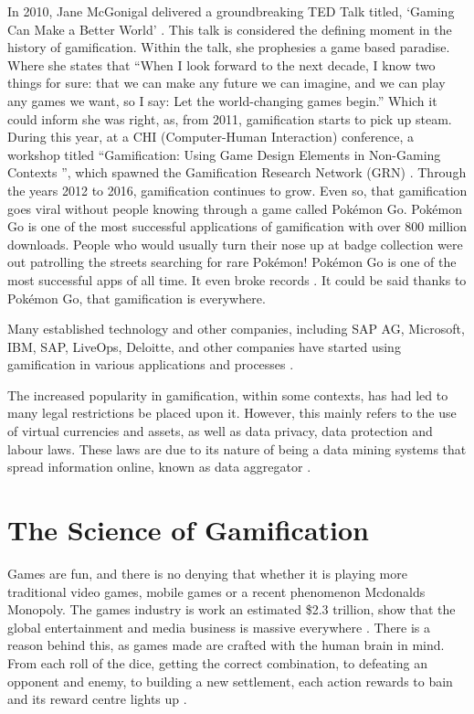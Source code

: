 		In 2010, Jane McGonigal delivered a groundbreaking TED Talk titled, ‘Gaming Can Make a Better World’ \cite{janeted}. This talk is considered the defining moment in the history of gamification. Within the talk, she prophesies a game based paradise. Where she states that “When I look forward to the next decade, I know two things for sure: that we can make any future we can imagine, and we can play any games we want, so I say: Let the world-changing games begin.\cite{janeted}” Which it could inform she was right, as, from 2011, gamification starts to pick up steam. During this year, at a CHI (Computer-Human Interaction) conference, a workshop titled “Gamification: Using Game Design Elements in Non-Gaming Contexts \cite{chi2011}”, which spawned the Gamification Research Network (GRN) \cite{gamresearch}. Through the years 2012 to 2016, gamification continues to grow. Even so, that gamification goes viral without people knowing through a game called Pokémon Go. Pokémon Go is one of the most successful applications of gamification with over 800 million downloads. People who would usually turn their nose up at badge collection were out patrolling the streets searching for rare Pokémon! Pokémon Go is one of the most successful apps of all time. It even broke records \cite{pokegwr,history}. It could be said thanks to Pokémon Go, that gamification is everywhere.
		
		Many established technology and other companies, including SAP AG, Microsoft, IBM, SAP, LiveOps, Deloitte, and other companies have started using gamification in various applications and processes \cite{silv11}.
		
		The increased popularity in gamification, within some contexts, has had led to many legal restrictions be placed upon it. However, this mainly refers to the use of virtual currencies and assets, as well as data privacy, data protection and labour laws. These laws are due to its nature of being a data mining systems that spread information online, known as data aggregator \cite{gamelaw,dataagg}.

	\section{The Science of Gamification}
		\label{sec:google_fu}
		
		Games are fun, and there is no denying that whether it is playing more traditional video games, mobile games or a recent phenomenon Mcdonalds Monopoly. The games industry is work an estimated \$2.3 trillion, show that the global entertainment and media business is massive everywhere \cite{gamescience}. There is a reason behind this, as games made are crafted with the human brain in mind. From each roll of the dice, getting the correct combination, to defeating an opponent and enemy, to building a new settlement, each action rewards to bain and its reward centre lights up \cite{sciencebehind}.
		

